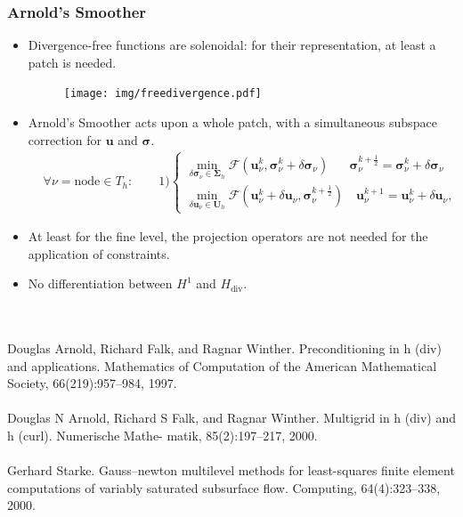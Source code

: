 \documentclass[8pt, oneside]{beamer}   	%
\newcommand{\bu}{\textbf{u}}
\newcommand{\bU}{\textbf{U}}
\newcommand{\bsigma}{\boldsymbol{\sigma}}
\newcommand{\bSigma}{\boldsymbol{\Sigma}}
\begin{document}
\begin{frame}
\frametitle{\textbf{Arnold's Smoother}}
\begin{itemize}
\item Divergence-free functions are solenoidal: for their representation, at least a patch is needed.
\begin{figure}[htbp!]
		\centering
	\texttt{[image: img/freedivergence.pdf]}
		\label{abb_arc}
\end{figure}
\item Arnold's Smoother acts upon a whole patch, with a simultaneous subspace correction for $\bu$ and $\bsigma$. 
\footnotesize{
\begin{align*}
&\forall \nu=\text{node} \in T_h:
\qquad
1)
\begin{cases}
\min \limits_{\delta \bsigma_{\nu} \in \bSigma_h } \mathcal{F}(\bu_{\nu}^k ,\bsigma_{\nu}^k+ \delta \bsigma_{\nu} ) \quad \:\:\: \bsigma_{\nu}^{k+\frac{1}{2}}=\bsigma_{\nu}^k+\delta \bsigma_{\nu}\\
\min \limits_{\delta \bu_{\nu} \in \bU_h} \mathcal{F}(\bu_{\nu}^k+ \delta \bu_{\nu} ,\bsigma_{\nu}^{k+\frac{1}{2}} ) \quad \bu_{\nu}^{k+1}=\bu_{\nu}^k+\delta \bu_{\nu},
\end{cases}
\end{align*}
}
\item 
\normalsize
At least for the fine level,  the projection operators are not needed for the application of constraints.
\item No differentiation between $H^1$ and $H_{\text{div}}$.
\end{itemize}
 ${}$\\

 ${}$\\
\footnotesize{Douglas Arnold, Richard Falk, and Ragnar Winther. Preconditioning in h (div) and applications. Mathematics
of Computation of the American Mathematical Society, 66(219):957–984, 1997.}
${}$\\
${}$\\
\footnotesize{Douglas N Arnold, Richard S Falk, and Ragnar Winther. Multigrid in h (div) and h (curl). Numerische Mathe-
matik, 85(2):197–217, 2000.}
${}$\\
${}$\\
\footnotesize{
Gerhard Starke. Gauss–newton multilevel methods for least-squares finite element computations of variably saturated subsurface flow. Computing, 64(4):323–338, 2000.}


\end{frame}
\end{document}
